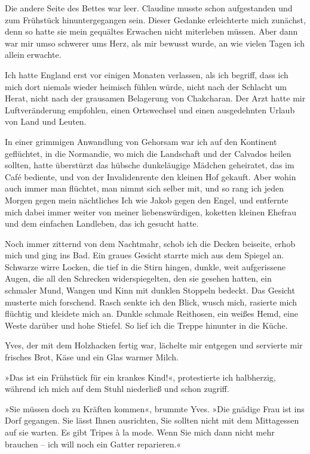 Die andere Seite des Bettes war leer. Claudine musste schon
aufgestanden und zum Frühstück hinuntergegangen sein. Dieser
Gedanke erleichterte mich zunächst, denn so hatte sie mein
gequältes Erwachen nicht miterleben müssen. Aber dann war mir umso
schwerer ums Herz, als mir bewusst wurde, an wie vielen Tagen ich
allein erwachte.

\bigpar

Ich hatte England erst vor einigen Monaten verlassen, als ich
begriff, dass ich mich dort niemals wieder heimisch fühlen würde,
nicht nach der Schlacht um Herat, nicht nach der grausamen
Belagerung von Chakcharan. Der Arzt hatte mir Luftveränderung
empfohlen, einen Ortswechsel und einen ausgedehnten Urlaub von Land
und Leuten.

In einer grimmigen Anwandlung von Gehorsam war ich auf den
Kontinent geflüchtet, in die Normandie, wo mich die Landschaft und
der Calvados heilen sollten, hatte überstürzt das hübsche
dunkeläugige Mädchen geheiratet, das im Café bediente, und von der
Invalidenrente den kleinen Hof gekauft. Aber wohin auch immer man
flüchtet, man nimmt sich selber mit, und so rang ich jeden Morgen
gegen mein nächtliches Ich wie Jakob gegen den Engel, und entfernte
mich dabei immer weiter von meiner liebenswürdigen, koketten
kleinen Ehefrau und dem einfachen Landleben, das ich gesucht
hatte.

\bigpar

Noch immer zitternd von dem Nachtmahr, schob ich die Decken
beiseite, erhob mich und ging ins Bad. Ein graues Gesicht starrte
mich aus dem Spiegel an. Schwarze wirre Locken, die tief in die
Stirn hingen, dunkle, weit aufgerissene Augen, die all den
Schrecken widerspiegelten, den sie gesehen hatten, ein schmaler
Mund, Wangen und Kinn mit dunklen Stoppeln bedeckt. Das Gesicht
musterte mich forschend. Rasch senkte ich den Blick, wusch mich,
rasierte mich flüchtig und kleidete mich an. Dunkle schmale
Reithosen, ein weißes Hemd, eine Weste darüber und hohe Stiefel. So
lief ich die Treppe hinunter in die Küche.

\bigpar

Yves, der mit dem Holzhacken fertig war, lächelte mir entgegen und
servierte mir frisches Brot, Käse und ein Glas warmer Milch.

»Das ist ein Frühstück für ein krankes Kind!«, protestierte ich
halbherzig, während ich mich auf dem Stuhl niederließ und schon
zugriff.

»Sie müssen doch zu Kräften kommen«, brummte Yves. »Die gnädige
Frau ist ins Dorf gegangen. Sie lässt Ihnen ausrichten, Sie sollten
nicht mit dem Mittagessen auf sie warten. Es gibt Tripes à la mode.
Wenn Sie mich dann nicht mehr brauchen – ich will noch ein Gatter
reparieren.«

